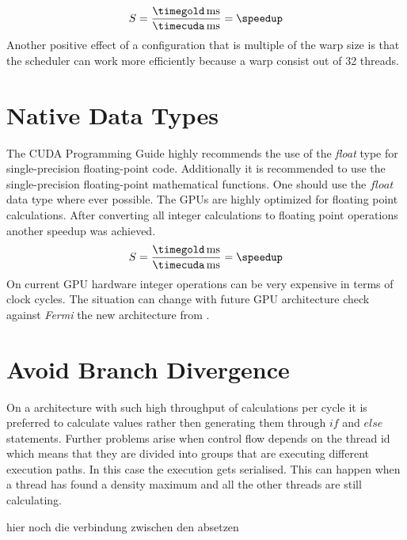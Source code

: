 \fpDiv{\speedup}{\timegold}{\timecuda}
\begin{equation*}\label{eq:speedup4}
	S = \frac{\unit[\timegold]{ms}}{\unit[\timecuda]{ms}} = \speedup
\end{equation*}
 Another positive effect of a configuration that is multiple of the warp size is
that the scheduler can work more efficiently because a warp consist out of 32 
threads. 

\section{Native Data Types}
The \gls{CUDA} Programming Guide \citep{citeulike:3325943} highly recommends the
use of the \emph{float} type for single-precision floating-point code.
Additionally it is recommended to use the single-precision floating-point
mathematical functions. One should use the $float$ data type where ever
possible. The \glspl{GPU} are highly optimized for floating point calculations.
After converting all integer calculations to floating point operations another
speedup was achieved.
\fpDiv{\speedup}{\timegold}{\timecuda}
\begin{equation*}\label{eq:speedup5}
	S = \frac{\unit[\timegold]{ms}}{\unit[\timecuda]{ms}} = \speedup
\end{equation*}
On current \gls{GPU} hardware integer operations can be very expensive in terms
of clock cycles. The situation can change with future \gls{GPU} architecture check
against \emph{Fermi} the new architecture from {} 
{}.



\section{Avoid Branch Divergence} %
\label{sec:avoid_branch_divergence}
On a architecture with such high throughput of calculations per cycle it is
preferred to calculate values rather then generating them through $if$ and
$else$ statements. Further problems arise when control flow depends on the
thread id which means that they are divided into groups that are executing
different execution paths. In this case the execution gets serialised. This can
happen when a thread has found a density maximum and all the other threads are
still calculating.  

{\color{red} hier noch die verbindung zwischen den absetzen}

